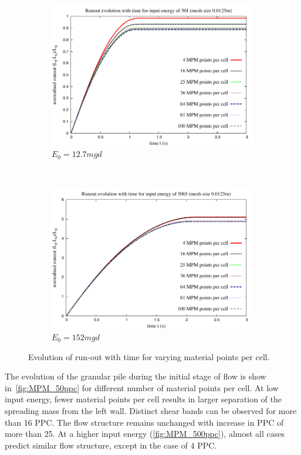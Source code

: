 \begin{figure}[tbhp]
\centering
\begin{subfigure}[b]{0.95\textwidth}
\includegraphics[width=\textwidth]{Runout_50}
\caption{$E_0=12.7mgd$}
\label{fig:Runout_50}
\end{subfigure}
\\
\begin{subfigure}[b]{0.95\textwidth}
\centering
\includegraphics[width=\textwidth]{Runout_500}
\caption{$E_0=152mgd$}
\label{fig:Runout_500}
\end{subfigure}
\caption{Evolution of run-out with time for varying material points per cell.}
\label{fig:Runout_MPM}
\end{figure}

The evolution of the granular pile during the initial stage of flow is show 
in~\cref{fig:MPM_50ppc} for different number of material points per cell. At 
low input energy, fewer material points per cell results in larger separation 
of the spreading mass from the left wall. Distinct shear bands can be observed 
for more than 16 PPC. 
The flow structure remains unchanged with increase in PPC of more than 25. At 
a higher input energy
(\cref{fig:MPM_500ppc}), almost all cases predict similar flow structure, 
except in the case of 4 PPC.

